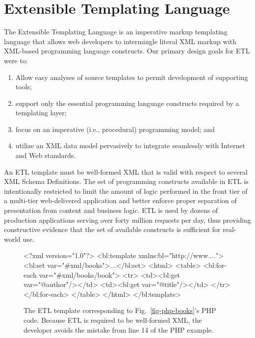 \documentclass{www2003-submission}
\newcommand{\figref}[1]{Fig.~\ref{fig-#1}}
\begin{document}
\section{\hspace*{-.1in}Extensible Templating Language}
\label{sec-etl}

The Extensible Templating Language is an imperative markup templating
language that allows web developers to intermingle literal XML markup
with XML-based programming language constructs.  Our primary design
goals for ETL were to:

\begin{enumerate}
\item Allow easy analyses of source templates to permit development of
supporting tools; 
\item support only the essential programming language constructs
required by a templating layer; 
\item focus on an imperative (i.e., procedural) programming model; and
\item utilize an XML data model pervasively to integrate seamlessly
with Internet and Web standards.
\end{enumerate}

An ETL template must be well-formed XML that is valid with respect to
several XML Schema Definitions.  The set of programming constructs
available in ETL is intentionally restricted to limit the amount of
logic performed in the front tier of a multi-tier web-delivered
application and better enforce proper separation of presentation from
content and business logic.  ETL is used by dozens of production
applications serving over forty million requests per day, thus
providing constructive evidence that the set of available constructs
is sufficient for real-world use.

\begin{figure}[tb]
\begin{listing}{1}
<?xml version="1.0"?>
<bl:template xmlns:bl="http://www....">
 <bl:set var="#xml/books">...</bl:set>
 <html>
  <table>
   <bl:for-each var="#xml/books/book">
    <tr> 
     <td><bl:get var="@author"/></td>
     <td><bl:get var="@title"/></td>
    </tr>
   </bl:for-each>
  </table>
 </html>
</bl:template>
\end{listing}%
\caption{The ETL template corresponding to \figref{php-books}'s PHP
code. Because ETL is required to be well-formed XML, the developer
avoids the mistake from line 14 of the PHP example.
\label{fig-etl-books}}
\end{figure}
\end{document}
